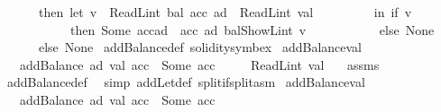 \begin{isabellebody}
\ \ \ \ \ \ then\ {\isacharparenleft}{\kern0pt}let\ v\ {\isacharequal}{\kern0pt}\ ReadL\isactrlsub i\isactrlsub n\isactrlsub t\ {\isacharparenleft}{\kern0pt}bal\ {\isacharparenleft}{\kern0pt}acc\ ad{\isacharparenright}{\kern0pt}{\isacharparenright}{\kern0pt}\ {\isacharplus}{\kern0pt}\ ReadL\isactrlsub i\isactrlsub n\isactrlsub t\ val\isanewline
\ \ \ \ \ \ \ \ \ in\ if\ {\isacharparenleft}{\kern0pt}v\ {\isacharless}{\kern0pt}\ {}{\isacharcircum}{\kern0pt}{}{}{}{\isacharparenright}{\kern0pt}\isanewline
\ \ \ \ \ \ \ \ \ \ \ then\ Some\ {\isacharparenleft}{\kern0pt}acc{\isacharparenleft}{\kern0pt}ad\ {\isacharcolon}{\kern0pt}{\isacharequal}{\kern0pt}\ acc\ ad\ {\isasymlparr}bal{\isacharcolon}{\kern0pt}{\isacharequal}{\kern0pt}ShowL\isactrlsub i\isactrlsub n\isactrlsub t\ v{\isasymrparr}{\isacharparenright}{\kern0pt}{\isacharparenright}{\kern0pt}\isanewline
\ \ \ \ \ \ \ \ \ \ \ else\ None{\isacharparenright}{\kern0pt}\isanewline
\ \ \ \ \ \ else\ None{\isacharparenright}{\kern0pt}{\isachardoublequoteclose}\isanewline
\isanewline
{}\isamarkupfalse%
\ addBalance{\isacharunderscore}{\kern0pt}def\ {\isacharbrackleft}{\kern0pt}solidity{\isacharunderscore}{\kern0pt}symbex{\isacharbrackright}{\kern0pt}\isanewline
\isanewline
{}\isamarkupfalse%
\ addBalance{\isacharunderscore}{\kern0pt}val{}{\isacharcolon}{\kern0pt}\isanewline
\ \ \ {\isachardoublequoteopen}addBalance\ ad\ val\ acc\ {\isacharequal}{\kern0pt}\ Some\ acc{\isacharprime}{\kern0pt}{\isachardoublequoteclose}\isanewline
\ \ \ \ \ {\isachardoublequoteopen}ReadL\isactrlsub i\isactrlsub n\isactrlsub t\ val\ {\isasymge}\ {}{\isachardoublequoteclose}\isanewline
%
\isadelimproof
%
\endisadelimproof
%
\isatagproof
{}\isamarkupfalse%
\ assms\ \isamarkupfalse%
\ addBalance{\isacharunderscore}{\kern0pt}def\ \isamarkupfalse%
\ {\isacharparenleft}{\kern0pt}simp\ add{\isacharcolon}{\kern0pt}Let{\isacharunderscore}{\kern0pt}def\ split{\isacharcolon}{\kern0pt}if{\isacharunderscore}{\kern0pt}split{\isacharunderscore}{\kern0pt}asm{\isacharparenright}{\kern0pt}%
\endisatagproof
{\isafoldproof}%
%
\isadelimproof
\isanewline
%
\endisadelimproof
\isanewline
{}\isamarkupfalse%
\ addBalance{\isacharunderscore}{\kern0pt}val{}{\isacharcolon}{\kern0pt}\isanewline
\ \ \ {\isachardoublequoteopen}addBalance\ ad\ val\ acc\ {\isacharequal}{\kern0pt}\ Some\ acc{\isacharprime}{\kern0pt}{\isachardoublequoteclose}\isanewline

\end{isabellebody}
